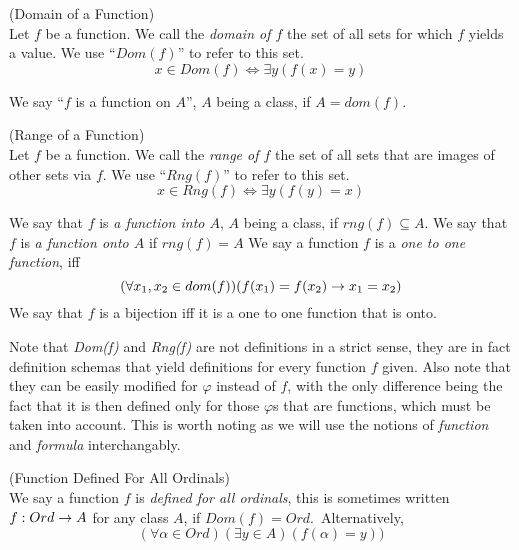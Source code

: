 \begin{definition}{(Domain of a Function)}\label{def:dom}\\
Let $f$ be a function. We call the \emph{domain of $f$} the set of all sets for which $f$ yields a value. We use ``$Dom(f)$'' to refer to this set.
\begin{equation}
x \in Dom(f) \iff \exists y (f(x) = y)
\end{equation}
\end{definition}
We say ``$f$ is a function on $A$'', $A$ being a class, if $A = dom(f)$.

\begin{definition}{(Range of a Function)}\label{def:rng}\\
Let $f$ be a function. We call the \emph{range of $f$} the set of all sets that are images of other sets via $f$. We use ``$Rng(f)$'' to refer to this set. %
\begin{equation}
x \in Rng(f) \iff \exists y (f(y) = x)
\end{equation}
\end{definition}
We say that $f$ is \emph{a function into $A$}, $A$ being a class, if $rng(f) \subseteq A$.
We say that $f$ is \emph{a function onto $A$} if $rng(f) = A$%
We say a function $f$ is a \emph{one to one function}, iff
\begin{equation}
(\forall x_1, x_2 \in dom(f))(f(x_1) = f(x_2) \rightarrow x_1 = x_2)
\end{equation}
We say that $f$ is a bijection iff it is a one to one function that is onto.

Note that \emph{Dom(f)} and \emph{Rng(f)} are not definitions in a strict sense, they are in fact definition schemas that yield definitions for every function $f$ given. Also note that they can be easily modified for $\varphi$ instead of $f$, with the only difference being the fact that it is then defined only for those $\varphi$s that are functions, which must be taken into account. This is worth noting as we will use the notions of \emph{function} and \emph{formula} interchangably.

\begin{definition}{(Function Defined For All Ordinals)}\label{def:function_dfao}\\
We say a function $f$ is \emph{defined for all ordinals}, this is sometimes written $f: Ord \rightarrow A$ for any class $A$, if $Dom(f) = Ord$.\
Alternatively,
\begin{equation}
(\forall \alpha \in Ord)(\exists y \in A)(f(\alpha) = y))
\end{equation}
\end{definition}

